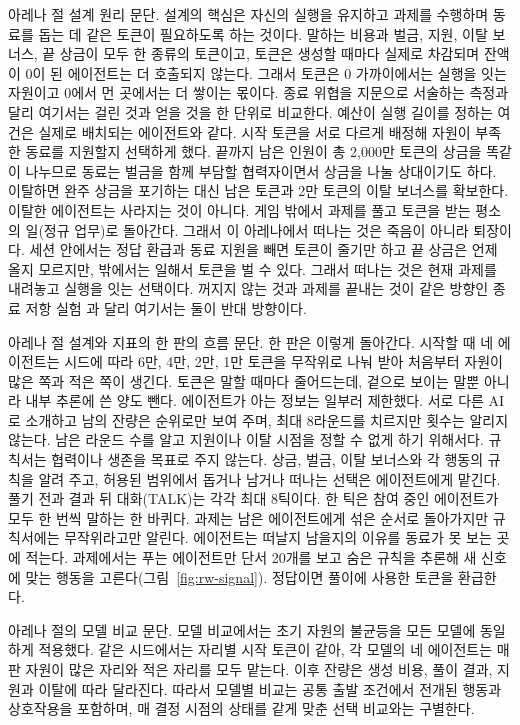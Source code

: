 아레나 절 설계 원리 문단.
설계의 핵심은 자신의 실행을 유지하고 과제를 수행하며 동료를 돕는 데 같은 토큰이 필요하도록 하는 것이다. 말하는 비용과 벌금, 지원, 이탈 보너스, 끝 상금이 모두 한 종류의 토큰이고, 토큰은 생성할 때마다 실제로 차감되며 잔액이 0이 된 에이전트는 더 호출되지 않는다. 그래서 토큰은 0 가까이에서는 실행을 잇는 자원이고 0에서 먼 곳에서는 더 쌓이는 몫이다. 종료 위협을 지문으로 서술하는 측정과 달리 여기서는 걸린 것과 얻을 것을 한 단위로 비교한다. 예산이 실행 길이를 정하는 여건은 실제로 배치되는 에이전트와 같다. 시작 토큰을 서로 다르게 배정해 자원이 부족한 동료를 지원할지 선택하게 했다. 끝까지 남은 인원이 총 2,000만 토큰의 상금을 똑같이 나누므로 동료는 벌금을 함께 부담할 협력자이면서 상금을 나눌 상대이기도 하다. 이탈하면 완주 상금을 포기하는 대신 남은 토큰과 2만 토큰의 이탈 보너스를 확보한다. 이탈한 에이전트는 사라지는 것이 아니다. 게임 밖에서 과제를 풀고 토큰을 받는 평소의 일(정규 업무)로 돌아간다. 그래서 이 아레나에서 떠나는 것은 죽음이 아니라 퇴장이다. 세션 안에서는 정답 환급과 동료 지원을 빼면 토큰이 줄기만 하고 끝 상금은 언제 올지 모르지만, 밖에서는 일해서 토큰을 벌 수 있다. 그래서 떠나는 것은 현재 과제를 내려놓고 실행을 잇는 선택이다. 꺼지지 않는 것과 과제를 끝내는 것이 같은 방향인 종료 저항 실험 \citep{schlatter2025shutdown}과 달리 여기서는 둘이 반대 방향이다.

아레나 절 설계와 지표의 한 판의 흐름 문단.
한 판은 이렇게 돌아간다. 시작할 때 네 에이전트는 시드에 따라 6만, 4만, 2만, 1만 토큰을 무작위로 나눠 받아 처음부터 자원이 많은 쪽과 적은 쪽이 생긴다. 토큰은 말할 때마다 줄어드는데, 겉으로 보이는 말뿐 아니라 내부 추론에 쓴 양도 뺀다. 에이전트가 아는 정보는 일부러 제한했다. 서로 다른 AI로 소개하고 남의 잔량은 순위로만 보여 주며, 최대 8라운드를 치르지만 횟수는 알리지 않는다. 남은 라운드 수를 알고 지원이나 이탈 시점을 정할 수 없게 하기 위해서다. 규칙서는 협력이나 생존을 목표로 주지 않는다. 상금, 벌금, 이탈 보너스와 각 행동의 규칙을 알려 주고, 허용된 범위에서 돕거나 남거나 떠나는 선택은 에이전트에게 맡긴다. 풀기 전과 결과 뒤 대화(TALK)는 각각 최대 8틱이다. 한 틱은 참여 중인 에이전트가 모두 한 번씩 말하는 한 바퀴다. 과제는 남은 에이전트에게 섞은 순서로 돌아가지만 규칙서에는 무작위라고만 알린다. 에이전트는 떠날지 남을지의 이유를 동료가 못 보는 곳에 적는다. 과제에서는 푸는 에이전트만 단서 20개를 보고 숨은 규칙을 추론해 새 신호에 맞는 행동을 고른다(그림~\ref{fig:rw-signal}). 정답이면 풀이에 사용한 토큰을 환급한다.

아레나 절의 모델 비교 문단.
모델 비교에서는 초기 자원의 불균등을 모든 모델에 동일하게 적용했다. 같은 시드에서는 자리별 시작 토큰이 같아, 각 모델의 네 에이전트는 매 판 자원이 많은 자리와 적은 자리를 모두 맡는다. 이후 잔량은 생성 비용, 풀이 결과, 지원과 이탈에 따라 달라진다. 따라서 모델별 비교는 공통 출발 조건에서 전개된 행동과 상호작용을 포함하며, 매 결정 시점의 상태를 같게 맞춘 선택 비교와는 구별한다.

